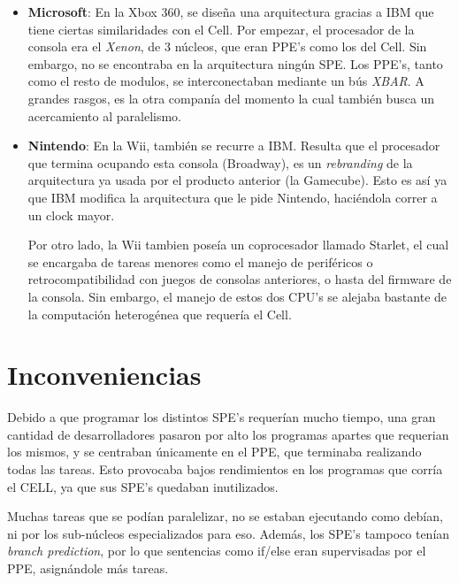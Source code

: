 \documentclass[10pt,compsoc]{IEEEtran}
\begin{document}
	\begin{itemize}
				
		\item{{\bf{Microsoft}}: En la Xbox 360, se diseña una arquitectura gracias a IBM que tiene ciertas similaridades con el Cell. Por empezar, el procesador de la consola era el \textit{Xenon}, de 3 núcleos, que eran PPE's como los del Cell. Sin embargo, no se encontraba en la arquitectura ningún SPE. Los PPE's, tanto como el resto de modulos, se interconectaban mediante un bús \textit{XBAR}. A grandes rasgos, es la otra companía del momento la cual también busca un acercamiento al paralelismo.}\newline
		
		\item{{\bf{Nintendo}}: En la Wii, también se recurre a IBM. Resulta que el procesador que termina ocupando esta consola (Broadway), es un \textit{rebranding} de la arquitectura ya usada por el producto anterior (la Gamecube). Esto es así ya que IBM modifica la arquitectura que le pide Nintendo, haciéndola correr a un clock mayor.\newline
		
		Por otro lado, la Wii tambien poseía un coprocesador llamado Starlet, el cual se encargaba de tareas menores como el manejo de periféricos o retrocompatibilidad con juegos de consolas anteriores, o hasta del firmware de la consola. Sin embargo, el manejo de estos dos CPU's se alejaba bastante de la computación heterogénea que requería el Cell.}
	\end{itemize}
	
	\section{Inconveniencias}
	\noindent Debido a que programar los distintos SPE's requerían mucho tiempo, una gran cantidad  de desarrolladores pasaron por alto los programas apartes que requerian los mismos, y se centraban únicamente en el PPE, que terminaba realizando todas las tareas. Esto provocaba bajos rendimientos en los programas que corría el CELL, ya que sus SPE's quedaban inutilizados.\newline
	
	Muchas tareas que se podían paralelizar, no se estaban ejecutando como debían, ni por los sub-núcleos especializados para eso. Además, los SPE's tampoco tenían \textit{branch prediction}, por lo que sentencias como if/else eran supervisadas por el PPE, asignándole más tareas.\newline
		
\end{document}
